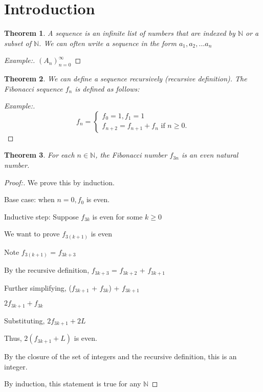 \documentclass[12pt]{article}
\newtheorem{theorem}{Theorem}[section]
\begin{document}
\section{Introduction}

\begin{theorem}
    A sequence is an infinite list of numbers that are indexed by $\mathbb{N}$ or a subset of $\mathbb{N}$. We can often write a sequence in the form $a_1, a_2, ... a_n$
\end{theorem}

\begin{proof}[Example:]
    $(A_n)_{n=0}^\infty$
\end{proof}

\begin{theorem}
    We can define a sequence recursively (recursive definition). The Fibonacci sequence $f_n$ is defined as follows:
\end{theorem}

\begin{proof}[Example:]
    \[
    f_n = 
        \begin{cases}
        f_0 = 1, f_1 = 1 \\
        f_{n+2} = f_{n+1} + f_n \text{ if } n \geq 0.
        \end{cases}
    \]
\end{proof}

\newpage

\begin{theorem}
    For each $n \in \mathbb{N}$, the Fibonacci number $f_{3n}$ is an even natural number.
\end{theorem}

\begin{proof}[Proof:]
    We prove this by induction.

    Base case: when $n = 0, f_0$ is even.

    Inductive step: Suppose $f_{3k}$ is even for some $k \geq 0$

    We want to prove $f_{3(k+1)}$ is even

    Note $f_{3(k+1)}$ = $f_{3k+3}$

    By the recursive definition, $f_{3k+3}$ = $f_{3k+2}$ + $f_{3k+1}$

    Further simplifying, ($f_{3k+1}$ + $f_{3k}$) + $f_{3k+1}$

    $2f_{3k+1} + f_{3k}$

    Substituting, $2f_{3k+1} + 2L$

    Thus, $2(f_{3k+1} + L)$ is even.

    By the closure of the set of integers and the recursive definition, this is an integer.

    By induction, this statement is true for any $\mathbb{N}$ 
\end{proof}
\end{document}
